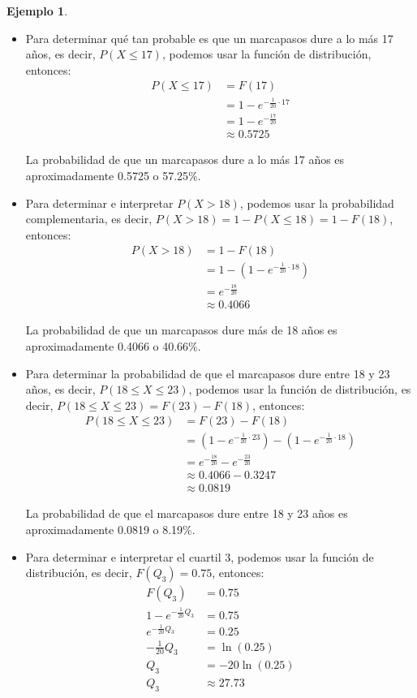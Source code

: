 \documentclass{article}
\theoremstyle{definition}
\newtheorem{example}[definition]{Ejemplo}
\theoremstyle{plain}
\theoremstyle{remark}
\begin{document}
\begin{example}
\begin{itemize}
\item Para determinar qué tan probable es que un marcapasos dure a lo más 17 años, es decir, $P(X \leq 17)$, podemos usar la función de distribución, entonces:
\begin{align*}
P(X \leq 17) &= F(17) \\
&= 1 - e^{-\frac{1}{20} \cdot 17} \\
&= 1 - e^{-\frac{17}{20}} \\
&\approx 0.5725
\end{align*}

La probabilidad de que un marcapasos dure a lo más 17 años es aproximadamente 0.5725 o 57.25\%.

\item Para determinar e interpretar $P(X > 18)$, podemos usar la probabilidad complementaria, es decir, $P(X > 18) = 1 - P(X \leq 18) = 1 - F(18)$, entonces:
\begin{align*}
P(X > 18) &= 1 - F(18) \\
&= 1 - \left( 1 - e^{-\frac{1}{20} \cdot 18} \right) \\
&= e^{-\frac{18}{20}} \\
&\approx 0.4066
\end{align*}

La probabilidad de que un marcapasos dure más de 18 años es aproximadamente 0.4066 o 40.66\%.

\item Para determinar la probabilidad de que el marcapasos dure entre 18 y 23 años, es decir, $P(18 \leq X \leq 23)$, podemos usar la función de distribución, es decir, $P(18 \leq X \leq 23) = F(23) - F(18)$, entonces:
\begin{align*}
P(18 \leq X \leq 23) &= F(23) - F(18) \\
&= \left( 1 - e^{-\frac{1}{20} \cdot 23} \right) - \left( 1 - e^{-\frac{1}{20} \cdot 18} \right) \\
&= e^{-\frac{18}{20}} - e^{-\frac{23}{20}} \\
&\approx 0.4066 - 0.3247 \\
&\approx 0.0819
\end{align*}

La probabilidad de que el marcapasos dure entre 18 y 23 años es aproximadamente 0.0819 o 8.19\%.

\item Para determinar e interpretar el cuartil 3, podemos usar la función de distribución, es decir, $F(Q_3) = 0.75$, entonces:
\begin{align*}
F(Q_3) &= 0.75 \\
1 - e^{-\frac{1}{20} Q_3} &= 0.75 \\
e^{-\frac{1}{20} Q_3} &= 0.25 \\
-\frac{1}{20} Q_3 &= \ln(0.25) \\
Q_3 &= -20 \ln(0.25) \\
Q_3 &\approx 27.73
\end{align*}


\end{itemize}
\end{example}
\end{document}
